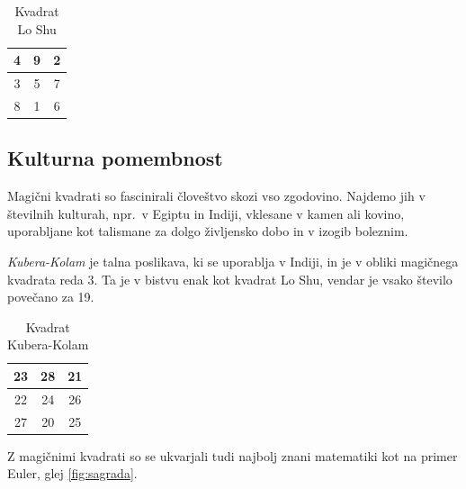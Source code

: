 \documentclass[a4paper,12pt]{article}
\begin{document}


\begin{table}[!ht]
   \centering
   \caption{Kvadrat Lo Shu}
   \label{table:loshu}
   \large
   \begin{tabular}{|*{3}{c|}} \hline
       4 & 9 & 2 \\ \hline
       3 & 5 & 7 \\ \hline
       8 & 1 & 6 \\ \hline
   \end{tabular}
\end{table}


\subsection{Kulturna pomembnost}

Magični kvadrati so fascinirali človeštvo skozi vso zgodovino. Najdemo jih
v številnih kulturah, npr.\ v Egiptu in Indiji, vklesane v kamen ali
kovino, uporabljane kot talismane za dolgo življensko dobo in v
izogib boleznim.

\emph{Kubera-Kolam} je talna poslikava, ki se uporablja v Indiji, in je v
obliki magičnega kvadrata reda 3. Ta je v bistvu enak kot kvadrat
Lo Shu, vendar je vsako število povečano za 19.


\begin{table}[!ht]
   \centering
   \caption{Kvadrat Kubera-Kolam}
   \label{table:kubera}
   \begin{tabular}{|*{3}{c|}} \hline
    23 & 28 & 21 \\\hline
    22 & 24 & 26 \\\hline
    27 & 20 & 25 \\\hline
   \end{tabular}
\end{table}


Z magičnimi kvadrati so se ukvarjali tudi najbolj znani matematiki kot na
primer Euler, glej \ref{fig:sagrada}. %

\end{document}
